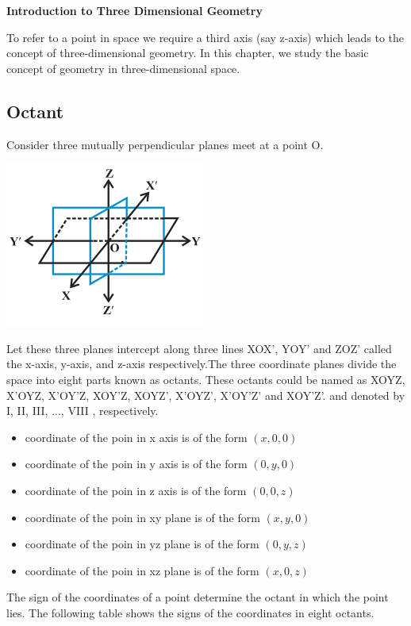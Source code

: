 \documentclass[12pt]{article}
\begin{document}
\begin{center}
    {\LARGE \textbf{Introduction to Three Dimensional Geometry} }
\end{center}

    To refer to a point in space we require a third axis (say z-axis) which leads to the concept of three-dimensional geometry. In this chapter, we study the basic concept of geometry in three-dimensional space.

    \subsection*{Octant}

Consider three mutually perpendicular planes meet at a point O. 
\begin{center}
    \includegraphics*[scale=0.7]{1.png}
\end{center}


Let these three planes intercept along three lines XOX’, YOY’ and ZOZ’ called the x-axis, y-axis, and z-axis respectively.The three coordinate planes divide the space into eight parts known
as octants. These octants could be named as XOYZ, X'OYZ, X'OY'Z, XOY'Z, XOYZ',
X'OYZ', X'OY'Z' and XOY'Z'. and denoted by I, II, III, ..., VIII , respectively.

\begin{itemize}
    \item coordinate of the poin in x axis is of the form $(x,0,0)$
    \item coordinate of the poin in y axis is of the form $(0,y,0)$
    \item coordinate of the poin in z axis is of the form $(0,0,z)$
    \item coordinate of the poin in xy plane is of the form $(x,y,0)$
    \item coordinate of the poin in yz plane is of the form $(0,y,z)$
    \item coordinate of the poin in xz plane is of the form $(x,0,z)$
\end{itemize}
The sign of the coordinates of a point determine the octant in which the
point lies. The following table shows the signs of the coordinates in eight octants.
\end{document}
